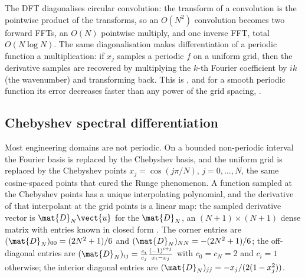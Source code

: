 The DFT diagonalises circular convolution: the transform of a convolution is
the pointwise product of the transforms, so an $O(N^{2})$ convolution becomes
two forward FFTs, an $O(N)$ pointwise multiply, and one inverse FFT, total
$O(N \log N)$. The same diagonalisation makes differentiation of a periodic
function a multiplication: if $x_{j}$ samples a periodic $f$ on a uniform
grid, then the derivative samples are recovered by multiplying the
$k$-th Fourier coefficient by $ik$ (the wavenumber) and transforming back.
This is , and for a smooth periodic
function its error decreases faster than any power of the grid spacing,
.

\subsection{Chebyshev spectral differentiation}

Most engineering domains are not periodic. On a bounded non-periodic interval
the Fourier basis is replaced by the Chebyshev basis, and the uniform grid is
replaced by the Chebyshev points $x_{j} = \cos(j\pi/N)$, $j = 0, \ldots, N$,
the same cosine-spaced points that cured the Runge phenomenon. A function
sampled at the Chebyshev points has a unique interpolating polynomial, and
the derivative of that interpolant at the grid points is a linear map: the
sampled derivative vector is $\mat{D}_{N}\vect{u}$ for the
 $\mat{D}_{N}$, an $(N+1) \times
(N+1)$ dense matrix with entries known in closed form
\cite[ch.~6]{text:v2ch06-trefethen-spectral}. The corner entries are
$(\mat{D}_{N})_{00} = (2N^{2}+1)/6$ and $(\mat{D}_{N})_{NN} =
-(2N^{2}+1)/6$; the off-diagonal entries are $(\mat{D}_{N})_{ij} =
\frac{c_{i}}{c_{j}}\frac{(-1)^{i+j}}{x_{i}-x_{j}}$ with $c_{0} = c_{N} = 2$
and $c_{i} = 1$ otherwise; the interior diagonal entries are
$(\mat{D}_{N})_{jj} = -x_{j}/(2(1 - x_{j}^{2}))$.

